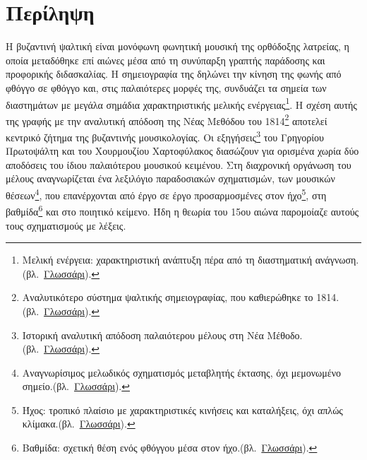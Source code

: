 \documentclass[a4paper]{article}
\newcommand{\musnote}[2]{\footnote{#2\enspace(βλ.~\hyperlink{gl:#1}{Γλωσσάρι}).}}
\begin{document}
\section*{Περίληψη}
Η βυζαντινή ψαλτική είναι μονόφωνη φωνητική μουσική της ορθόδοξης λατρείας, η οποία μεταδόθηκε επί αιώνες μέσα από τη συνύπαρξη γραπτής παράδοσης και προφορικής διδασκαλίας. Η σημειογραφία της δηλώνει την κίνηση της φωνής από φθόγγο σε φθόγγο και, στις παλαιότερες μορφές της, συνδυάζει τα σημεία των διαστημάτων με μεγάλα σημάδια χαρακτηριστικής μελικής ενέργειας\musnote{melic-energy}{Μελική ενέργεια: χαρακτηριστική ανάπτυξη πέρα από τη διαστηματική ανάγνωση.}. Η σχέση αυτής της γραφής με την αναλυτική απόδοση της Νέας Μεθόδου του 1814\musnote{new-method}{Αναλυτικότερο σύστημα ψαλτικής σημειογραφίας, που καθιερώθηκε το 1814.} αποτελεί κεντρικό ζήτημα της βυζαντινής μουσικολογίας. Οι εξηγήσεις\musnote{exegesis}{Ιστορική αναλυτική απόδοση παλαιότερου μέλους στη Νέα Μέθοδο.} του Γρηγορίου Πρωτοψάλτη και του Χουρμουζίου Χαρτοφύλακος διασώζουν για ορισμένα χωρία δύο αποδόσεις του ίδιου παλαιότερου μουσικού κειμένου. Στη διαχρονική οργάνωση του μέλους αναγνωρίζεται ένα λεξιλόγιο παραδοσιακών σχηματισμών, των μουσικών θέσεων\musnote{formula}{Αναγνωρίσιμος μελωδικός σχηματισμός μεταβλητής έκτασης, όχι μεμονωμένο σημείο.}, που επανέρχονται από έργο σε έργο προσαρμοσμένες στον ήχο\musnote{echos}{Ήχος: τροπικό πλαίσιο με χαρακτηριστικές κινήσεις και καταλήξεις, όχι απλώς κλίμακα.}, στη βαθμίδα\musnote{degree}{Βαθμίδα: σχετική θέση ενός φθόγγου μέσα στον ήχο.} και στο ποιητικό κείμενο. Ήδη η θεωρία του 15ου αιώνα παρομοίαζε αυτούς τους σχηματισμούς με λέξεις.
\end{document}

